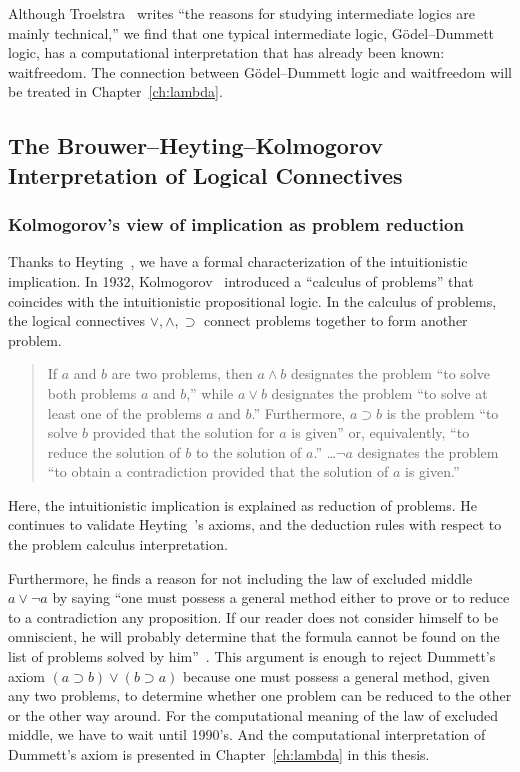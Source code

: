 Although Troelstra~\cite[p.~223]{goedelcollected} writes ``the reasons
for studying intermediate logics are mainly technical,'' we find that
one typical intermediate logic, G\"odel--Dummett logic, has a
computational interpretation that has already been known: waitfreedom.
The connection between G\"odel--Dummett logic and waitfreedom will be
treated in Chapter~\ref{ch:lambda}.

\subsection{The Brouwer--Heyting--Kolmogorov Interpretation of Logical Connectives}

\subsubsection{Kolmogorov's view of implication as problem reduction}

Thanks to Heyting~\cite{heyting1930}, we have a formal
characterization of the intuitionistic implication.
In 1932, Kolmogorov~\cite{kolmogorov1932} introduced a ``calculus of problems''
that coincides with the intuitionistic propositional logic.
In the calculus of problems, the logical connectives $\vee, \wedge,
\supset$ connect problems together to form another problem.
 \begin{quote}
  If $a$ and $b$ are two problems, then $a\land b$ designates the
  problem ``to solve both problems $a$ and $b$,'' while $a\lor b$
  designates the problem ``to solve at least one of the problems $a$ and
  $b$.''  Furthermore, $a\supset b$ is the problem ``to solve $b$
  provided that the solution for $a$ is given'' or, equivalently, ``to
  reduce the solution of $b$ to the solution of
  $a$.''  \ldots $\neg a$ designates the problem ``to obtain a
  contradiction provided that the solution of $a$ is
  given.''~\cite[p.~329]{kolmogorov1932}
 \end{quote}
 Here, the intuitionistic implication
 is explained as reduction of problems.
 He continues to validate Heyting~\cite{heyting1930}'s axioms, and the
 deduction rules with respect to the problem calculus interpretation.

 Furthermore, he finds a reason for not including the law of excluded
 middle $a\lor \neg a$ by saying ``one must possess a general method
 either to prove or to reduce to a contradiction any proposition.  If
 our reader does not consider himself to be omniscient, he will probably
 determine that the formula cannot be found on the list of problems
 solved by him''~\cite{kolmogorov1932}.
 This argument is enough to reject Dummett's axiom $(a\supset b)\lor
 (b\supset a)$ because one must possess a general method, given any two
 problems, to
 determine whether
 one problem can be reduced to the other or the other way around.
 For the computational meaning of the law of excluded middle, we have to
 wait until 1990's.
 And the computational interpretation of Dummett's axiom is
 presented in Chapter~\ref{ch:lambda} in this thesis.

